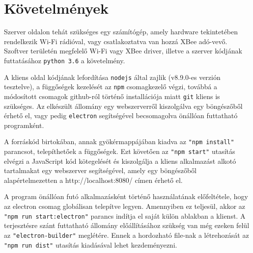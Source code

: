 \section{Követelmények}

Szerver oldalon tehát szükséges egy számítógép, amely hardware tekintetében
rendelkezik Wi-Fi rádióval, vagy csatlakoztatva van hozzá XBee adó-vevő.
Szoftver területén megfelelő Wi-Fi vagy XBee driver, illetve a szerver
kódjának futtatásához \verb|python 3.6| a követelmény.

A kliens oldal kódjának lefordítása \verb|nodejs| által zajlik (v8.9.0-es
verzión tesztelve), a függőségek kezelését az \verb|npm| csomagkezelő végzi,
továbbá a módosított csomagok github-ról történő installációja miatt \verb|git|
kliens is szükséges. Az elkészült állomány egy webszerverről kiszolgálva egy
böngészőből érhető el, vagy pedig \verb|electron| segítségével becsomagolva
önállóan futtatható programként.

A forráskód birtokában, annak gyökérmappájában kiadva az \verb|"npm install"|
parancsot, telepíthetőek a függőségek. Ezt követően az \verb|"npm start"|
utasítás elvégzi a JavaScript kód kötegelését és kiszolgálja a kliens
alkalmazást alkotó tartalmakat egy webszerver segítségével, amely egy
böngészőből alapértelmezetten a http://localhost:8080/ címen érhető el.

A program önállóan futó alkalmazásként történő használatának előfeltétele, hogy
az electron csomag globálisan telepítve legyen. Amennyiben ez teljesül, akkor az
\verb|"npm run start:electron"| parancs indítja el saját külön ablakban a
klienst. A terjesztésre szánt futtatható állomány előállításához szükség van még
ezeken felül az \verb|"electron-builder"| meglétére. Ennek a hordozható file-nak
a létrehozását az \verb|"npm run dist"| utasítás kiadásával lehet kezdeményezni.

